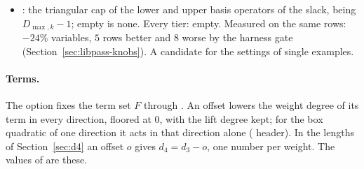 \begin{itemize}
\item {}: the triangular cap of the lower and upper basis operators of the slack,  being $D_{\max,k}-1$; empty is none. Every tier: empty. Measured on the same rows: $-24\%$ variables, $5$ rows better and $8$ worse by the harness gate (Section~\ref{sec:libpass-knobs}). A candidate for the settings of single examples.
\end{itemize}

\paragraph{Terms.} The option  fixes the term set $F$ through . An offset lowers the weight degree  of its term in every direction, floored at $0$, with the lift degree  kept; for the box quadratic of one direction it acts in that direction alone ( header). In the lengths of Section~\ref{sec:d4} an offset $o$ gives $d_4=d_3-o$, one number per weight. The values of  are these.
